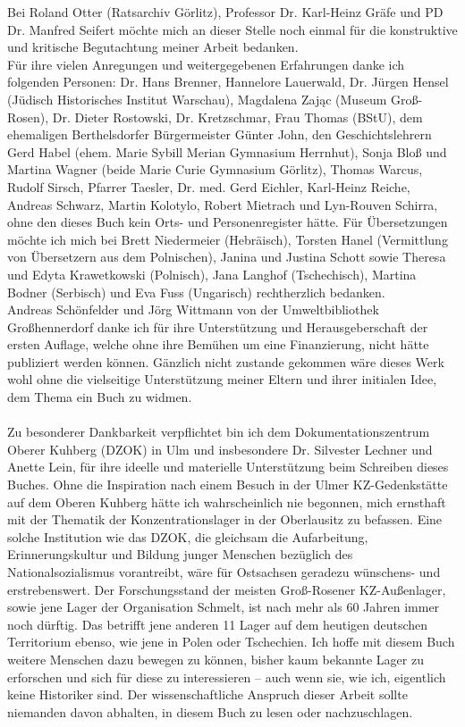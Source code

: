 Bei Roland Otter (Ratsarchiv Görlitz), Professor Dr. Karl-Heinz Gräfe und PD Dr. Manfred Seifert möchte mich an dieser Stelle noch einmal für die konstruktive und kritische Begutachtung meiner Arbeit bedanken.
\\
Für ihre vielen Anregungen und weitergegebenen Erfahrungen danke ich folgenden Personen: Dr. Hans Brenner, Hannelore Lauerwald, Dr. Jürgen Hensel (Jüdisch Historisches Institut Warschau), Magdalena Zając (Museum Groß-Rosen), Dr. Dieter Rostowski, Dr. Kretzschmar, Frau Thomas (BStU), dem ehemaligen Berthelsdorfer Bürgermeister Günter John, den Geschichtslehrern Gerd Habel (ehem. Marie Sybill Merian Gymnasium Herrnhut), Sonja Bloß und Martina Wagner (beide Marie Curie Gymnasium Görlitz), Thomas Warcus, Rudolf Sirsch, Pfarrer Taesler, Dr. med. Gerd Eichler, Karl-Heinz Reiche, Andreas Schwarz, Martin Kolotylo, Robert Mietrach und Lyn-Rouven Schirra, ohne den dieses Buch kein Orts- und Personenregister hätte.
Für Übersetzungen möchte ich mich bei Brett Niedermeier (Hebräisch), Torsten Hanel (Vermittlung von Übersetzern aus dem Polnischen), Janina und Justina Schott sowie Theresa und Edyta Krawetkowski (Polnisch), Jana Langhof (Tschechisch), Martina Bodner (Serbisch) und Eva Fuss (Ungarisch) rechtherzlich bedanken.
\\
Andreas Schönfelder und Jörg Wittmann von der Umweltbibliothek Großhennerdorf danke ich für ihre Unterstützung und Herausgeberschaft der ersten Auflage, welche ohne ihre Bemühen um eine Finanzierung, nicht hätte publiziert werden können. Gänzlich nicht zustande gekommen wäre dieses Werk wohl ohne die vielseitige Unterstützung meiner Eltern und ihrer initialen Idee, dem Thema ein Buch zu widmen.\\
\\
Zu besonderer Dankbarkeit verpflichtet bin ich dem Dokumentationszentrum Oberer Kuhberg (DZOK) in Ulm und insbesondere Dr. Silvester Lechner und Anette Lein, für ihre ideelle und materielle Unterstützung beim Schreiben dieses Buches. Ohne die Inspiration nach einem Besuch in der Ulmer KZ-Gedenkstätte auf dem Oberen Kuhberg hätte ich wahrscheinlich nie begonnen, mich ernsthaft mit der Thematik der Konzentrationslager in der Oberlausitz zu befassen. Eine solche Institution wie das DZOK, die gleichsam die Aufarbeitung, Erinnerungskultur und Bildung junger Menschen bezüglich des Nationalsozialismus vorantreibt, wäre für Ostsachsen geradezu wünschens- und erstrebenswert. Der Forschungsstand der meisten Groß-Rosener KZ-Außenlager, sowie jene Lager der Organisation Schmelt, ist nach mehr als 60 Jahren immer noch dürftig. Das betrifft jene anderen 11 Lager auf dem heutigen deutschen Territorium ebenso, wie jene in Polen oder Tschechien. Ich hoffe mit diesem Buch weitere Menschen dazu bewegen zu können, bisher kaum bekannte Lager zu erforschen und sich für diese zu interessieren -- auch wenn sie, wie ich, eigentlich keine Historiker sind. Der wissenschaftliche Anspruch dieser Arbeit sollte niemanden davon abhalten, in diesem Buch zu lesen oder nachzuschlagen.


